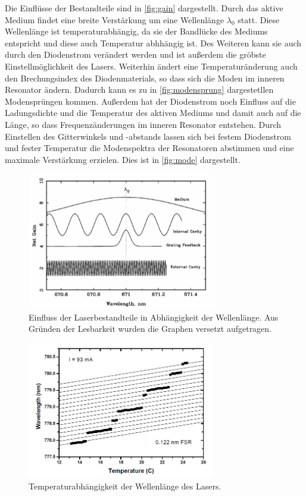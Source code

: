 Die Einflüsse der Bestandteile sind in \autoref{fig:gain} dargestellt. Durch das aktive Medium findet eine
breite Verstärkung um eine Wellenlänge $\lambda_0$ statt. Diese Wellenlänge ist temperaturabhängig, da sie
der Bandlücke des Mediums entspricht und diese auch Temperatur abhhängig ist. Des Weiteren kann sie auch durch
den Diodenstrom verändert werden und ist außerdem die gröbste Einstellmöglichkeit des Lasers.
Weiterhin ändert eine Temperaturänderung auch den Brechungsindex des
Diodenmaterials, so dass sich die Moden im inneren Resonator ändern. Dadurch kann es zu in \autoref{fig:modensprung}
dargestetllen Modensprüngen kommen. Außerdem hat der Diodenstrom noch Einfluss auf die Ladungsdichte und die
Temperatur des aktiven Mediums und damit auch auf die Länge, so dass Frequenzänderungen im inneren Resonator
entstehen. Durch Einstellen des Gitterwinkels und -abstands lassen sich bei festem Diodenstrom und fester Temperatur
die Modenspektra der Resonatoren abstimmen und eine maximale Verstärkung erzielen. Dies ist in \autoref{fig:mode}
dargestellt.

\begin{figure}[H]
    \centering
    \includegraphics[height=6cm]{content/pics/gain.png}
    \caption{Einfluss der Laserbestandteile in Abhängigkeit der Wellenlänge. Aus Gründen der Lesbarkeit
    wurden die Graphen versetzt aufgetragen. \cite{V60}}
    \label{fig:gain}
\end{figure}

\begin{figure}[H]
    \centering
    \includegraphics[height=6cm]{content/pics/modensprung.png}
    \caption{Temperaturabhängigkeit der Wellenlänge des Lasers. \cite{V60}}
    \label{fig:modensprung}
\end{figure}

